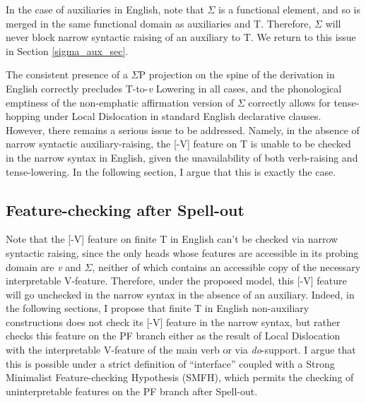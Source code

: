 In the case of auxiliaries in English, note that $\Sigma$ is a functional element, and so is merged in the same functional domain as auxiliaries and T. Therefore, $\Sigma$ will never block narrow syntactic raising of an auxiliary to T. We return to this issue in Section \ref{sigma_aux_sec}.

The consistent presence of a $\Sigma$P projection on the spine of the derivation in English correctly precludes T-to-{\it v} Lowering in all cases, and the phonological emptiness of the non-emphatic affirmation version of $\Sigma$ correctly allows for tense-hopping under Local Dislocation in standard English declarative clauses. However, there remains a serious issue to be addressed. Namely, in the absence of narrow syntactic auxiliary-raising, the [-V] feature on T is unable to be checked in the narrow syntax in English, given the unavailability of both verb-raising and tense-lowering. In the following section, I argue that this is exactly the case.

\subsection{Feature-checking after Spell-out}
Note that the [-V] feature on finite T in English \LLast can't be checked via narrow syntactic raising, since the only heads whose features are accessible in its probing domain are {\it v} and $\Sigma$, neither of which contains an accessible copy of the necessary interpretable V-feature. Therefore, under the proposed model, this [-V] feature will go unchecked in the narrow syntax in the absence of an auxiliary. Indeed, in the following sections, I propose that finite T in English non-auxiliary constructions does not check its [-V] feature in the narrow syntax, but rather checks this feature on the PF branch either as the result of Local Dislocation with the interpretable V-feature of the main verb or via {\it do}-support. I argue that this is possible under a strict definition of ``interface'' coupled with a Strong Minimalist Feature-checking Hypothesis (SMFH), which permits the checking of uninterpretable features on the PF branch after Spell-out.

